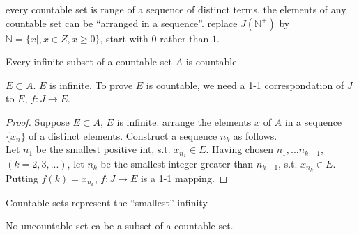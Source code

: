 every countable set is range of a sequence of distinct terms.
the elements of any countable set can be ``arranged in a sequence''.
replace $J(\mathbb{N}^+)$ by $\mathbb{N} = \{x|, x\in Z,x \geq 0\}$, start with $0$ rather than $1$.

\begin{thm}
    \label{thm:2.8}
    Every infinite subset of a countable set $A$ is countable
\end{thm}

$E\subset A$. $E$ is infinite. 
To prove $E$ is countable, we need a 1-1 correspondation of $J$ to $E$, $f:J\rightarrow E$.

\begin{proof}
    Suppose $E\subset A$, $E$ is infinite. 
    arrange the elements $x$ of $A$ in a sequence $\{x_n\}$ of a distinct elements. Construct a sequence $n_k$ as follows.\\
    Let $n_1$ be the smallest positive int, s.t. $x_{n_1}\in E$.
    Having chosen $n_1,...n_{k-1}$,$(k=2,3,...)$, let $n_k$ be the smallest integer greater than $n_{k-1}$, s.t. $x_{n_k} \in E$.\\
    Putting $f(k) = x_{n_k}$, $f:J\rightarrow E$ is a 1-1 mapping.
\end{proof}

Countable sets represent the ``smallest'' infinity.

No uncountable set ca be a subset of a countable set.



